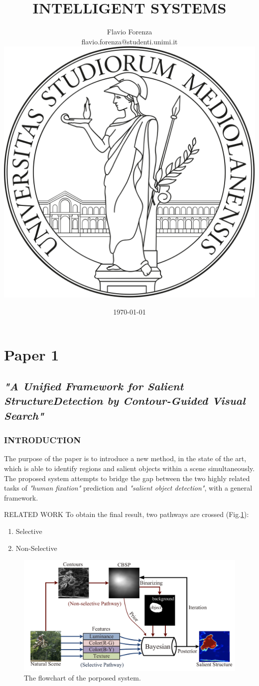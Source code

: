 \documentclass[10pt]{beamer}
\title[short]{INTELLIGENT SYSTEMS}
\author[Flavio Forenza]{Flavio Forenza \\ \tiny flavio.forenza@studenti.unimi.it\\[5mm] \includegraphics[scale = 0.06]{logoUnimi2.png}}
\institute{Department of Computer Science,\\ University of Milan, Italy}
\date{\tiny \today}
\begin{document}
\begin{frame}
    \maketitle
\end{frame}


\section{Paper 1}
\subsection{\emph{"A Unified Framework for Salient StructureDetection by Contour-Guided Visual Search"}}
\begin{frame}
    \frametitle{INTRODUCTION}
    The purpose of the paper is to introduce a new method, in the 
    state of the art, which is able to identify regions and salient objects 
    within a scene simultaneously. The proposed system attempts to 
    bridge the gap between the two highly related tasks of \emph{"human 
    fixation"} prediction and \emph{"salient object detection"}, with a general 
    framework.
\end{frame}

\begin{frame}{RELATED WORK}
    To obtain the final result, two pathways are crossed (Fig.\ref{fid: flowchart}):
    \begin{enumerate}
        \item Selective
        \item Non-Selective
    \end{enumerate}
    \begin{figure}[htbp]
        \centering
        \includegraphics[width = 0.8\linewidth]{images/paper1/selective and non-selective pathways.png}
        \centering
        \caption{The flowchart of the porposed system.}
        \label{fid: flowchart}
    \end{figure}
\end{frame}
\end{document}
